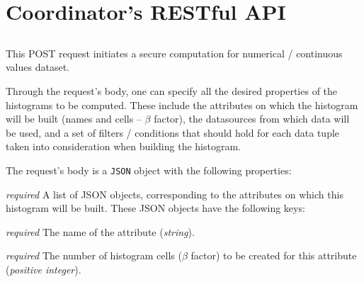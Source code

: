 \chapter{Coordinator's RESTful API}\label{c:coordinator-api}

\section[/smpc/histogram/numerical POST request]{\protect{}}\label{s:post1}

  This POST request initiates a secure computation for numerical / continuous values dataset.
  \begin{description}[labelwidth=5em, leftmargin=\dimexpr\labelwidth+\labelsep\relax]
       \item[Request:] Through the request's body, one can specify all the desired properties of the histograms to be computed.
  These include the attributes on which the histogram will be built (names and cells -- $\beta$ factor), the datasources from which data will be used, and a set of filters / conditions that should hold for each data tuple taken into consideration when building the histogram.


  The request's body is a \texttt{JSON} object with the following properties:

\begin{description}[labelwidth=6em, leftmargin=\dimexpr\labelwidth+\labelsep\relax]

    \item[\texttt{attributes}:] {\color{red}\textit{required}} A list of JSON objects, corresponding to the attributes on which this histogram will be built.
    These JSON objects have the following keys:

    \begin{description}[labelwidth=5em, leftmargin=\dimexpr\labelwidth+\labelsep\relax]
        \item[\texttt{name}:] {\color{red}\textit{required}} The name of the attribute (\textit{string}).

        \item[\texttt{cells}:] {\color{red}\textit{required}} The number of histogram cells ($\beta$ factor) to be created for this attribute (\textit{positive integer}).
    \end{description}


\end{description}
\end{description}
